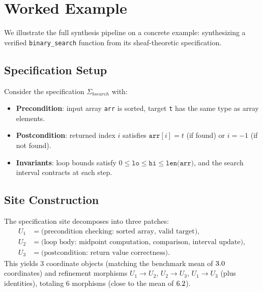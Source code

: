 \documentclass[11pt]{article}
\begin{document}
\section{Worked Example}\label{sec:worked-example}

We illustrate the full synthesis pipeline on a concrete example:
synthesizing a verified \texttt{binary\_search} function from its
sheaf-theoretic specification.

\subsection{Specification Setup}

Consider the specification $\Sigma_{\mathit{bsearch}}$ with:
\begin{itemize}[noitemsep]
  \item \textbf{Precondition}: input array \texttt{arr} is sorted,
        target \texttt{t} has the same type as array elements.
  \item \textbf{Postcondition}: returned index $i$ satisfies
        $\texttt{arr}[i] = t$ (if found) or $i = -1$ (if not found).
  \item \textbf{Invariants}: loop bounds satisfy
        $0 \leq \texttt{lo} \leq \texttt{hi} \leq \texttt{len(arr)}$,
        and the search interval contracts at each step.
\end{itemize}

\subsection{Site Construction}

The specification site decomposes into three patches:
\begin{align*}
  U_1 &= \text{(precondition checking: sorted array, valid target)}, \\
  U_2 &= \text{(loop body: midpoint computation, comparison, interval
         update)}, \\
  U_3 &= \text{(postcondition: return value correctness)}.
\end{align*}
This yields $3$ coordinate objects (matching the benchmark mean of
$3.0$ coordinates) and refinement morphisms
$U_1 \to U_2$, $U_2 \to U_3$, $U_1 \to U_3$ (plus identities),
totaling $6$ morphisms (close to the mean of $6.2$).
\end{document}
